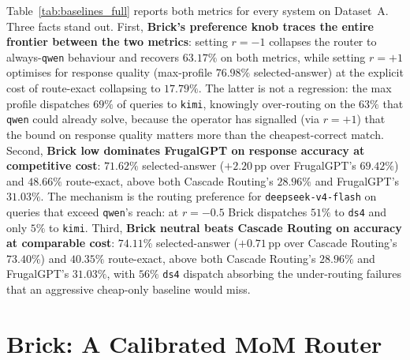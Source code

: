 \documentclass[twocolumn,10pt,a4paper]{article}
\begin{document}
Table~\ref{tab:baselines_full} reports both metrics for every system on Dataset~A. Three facts stand out. First, \textbf{Brick's preference knob traces the entire frontier between the two metrics}: setting $r{=}{-}1$ collapses the router to always-\texttt{qwen} behaviour and recovers $63.17\%$ on both metrics, while setting $r{=}{+}1$ optimises for response quality (max-profile $76.98\%$ selected-answer) at the explicit cost of route-exact collapsing to $17.79\%$. The latter is not a regression: the max profile dispatches $69\%$ of queries to \texttt{kimi}, knowingly over-routing on the $63\%$ that \texttt{qwen} could already solve, because the operator has signalled (via $r{=}{+}1$) that the bound on response quality matters more than the cheapest-correct match. Second, \textbf{Brick low dominates FrugalGPT on response accuracy at competitive cost}: $71.62\%$ selected-answer ($+2.20$\,pp over FrugalGPT's $69.42\%$) and $48.66\%$ route-exact, above both Cascade Routing's $28.96\%$ and FrugalGPT's $31.03\%$. The mechanism is the routing preference for \texttt{deepseek-v4-flash} on queries that exceed \texttt{qwen}'s reach: at $r{=}{-}0.5$ Brick dispatches $51\%$ to \texttt{ds4} and only $5\%$ to \texttt{kimi}. Third, \textbf{Brick neutral beats Cascade Routing on accuracy at comparable cost}: $74.11\%$ selected-answer ($+0.71$\,pp over Cascade Routing's $73.40\%$) and $40.35\%$ route-exact, above both Cascade Routing's $28.96\%$ and FrugalGPT's $31.03\%$, with $56\%$ \texttt{ds4} dispatch absorbing the under-routing failures that an aggressive cheap-only baseline would miss.

\section{Brick: A Calibrated MoM Router}\label{sec:brick}
\end{document}
